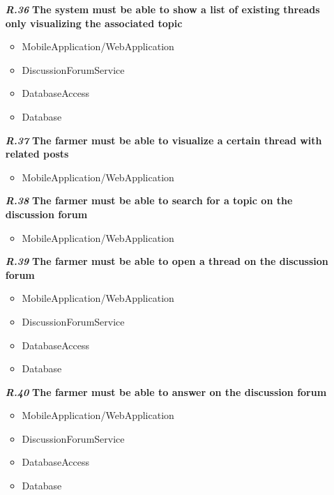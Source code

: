 \begin{itemize}
\item [\textbf{\textit{R.36}}] \textbf{The system must be able to show a list of existing threads only visualizing the associated topic}
\begin{itemize}
     \item MobileApplication/WebApplication
     \item DiscussionForumService
     \item DatabaseAccess
     \item Database
\end{itemize} 
\item [\textbf{\textit{R.37}}] \textbf{The farmer must be able to visualize a certain thread with related posts}
\begin{itemize}
     \item MobileApplication/WebApplication
\end{itemize} 
\item [\textbf{\textit{R.38}}] \textbf{The farmer must be able to search for a topic on the discussion forum}
\begin{itemize}
     \item MobileApplication/WebApplication
\end{itemize} 
\item [\textbf{\textit{R.39}}] \textbf{The farmer must be able to open a thread on the discussion forum}
\begin{itemize}
     \item MobileApplication/WebApplication
     \item DiscussionForumService
     \item DatabaseAccess
     \item Database
\end{itemize} 
\item [\textbf{\textit{R.40}}]\textbf{The farmer must be able to answer on the discussion forum}
\begin{itemize}
     \item MobileApplication/WebApplication
     \item DiscussionForumService
     \item DatabaseAccess
     \item Database
\end{itemize} 
\end{itemize}
        